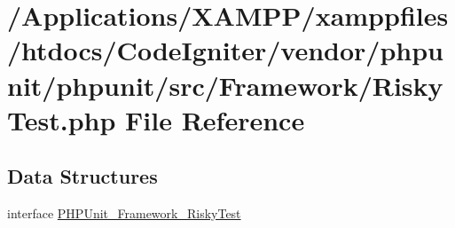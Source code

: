 \hypertarget{_risky_test_8php}{}\section{/\+Applications/\+X\+A\+M\+P\+P/xamppfiles/htdocs/\+Code\+Igniter/vendor/phpunit/phpunit/src/\+Framework/\+Risky\+Test.php File Reference}
\label{_risky_test_8php}
\subsection*{Data Structures}
\begin{DoxyCompactItemize}
\item 
interface \mbox{\hyperlink{interface_p_h_p_unit___framework___risky_test}{P\+H\+P\+Unit\+\_\+\+Framework\+\_\+\+Risky\+Test}}
\end{DoxyCompactItemize}
